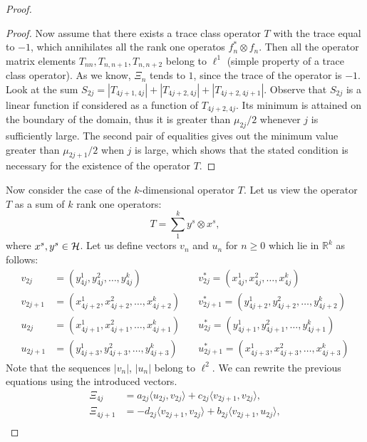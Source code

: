 \documentclass[12pt]{amsart}
\theoremstyle{case}
\begin{document}
\begin{proof}
\begin{proof}
        \medskip
        Now assume that there exists a trace class operator $T$ with the trace equal to $-1$, which annihilates all the rank one operatos $f^*_n \otimes f_n$.
        Then all the operator matrix elements $T_{nn}, T_{n, n+1}, T_{n, n+2}$ belong to $\ell^1$ (simple property of a trace class operator).
        As we know, $\Xi_n$ tends to $1$, since the trace of the operator is $-1$.
        Look at the sum $S_{2j} = |T_{4j+1, 4j}| + |T_{4j+2,4j}| + |T_{4j+2,4j+1}|$.
        Observe that $S_{2j}$ is a linear function if considered as a function of $T_{4j+2, 4j}$.
        Its minimum is attained on the boundary of the domain, thus it is greater than $\mu_{2j}/2$ whenever $j$ is sufficiently large.
        The second pair of equalities gives out the minimum value greater than $\mu_{2j+1}/2$ when $j$ is large,
          which shows that the stated condition is necessary for the existence of the operator $T$.
      \end{proof}
      Now consider the case of the $k$-dimensional operator $T$.
      Let us view the operator $T$ as a sum of $k$ rank one operators:
      \[
        T = \sum_1^k y^s \otimes x^s,
      \]
        where $x^s, y^s \in \cal{H}$.
      Let us define vectors $v_n$ and $u_n$ for $n \geq 0 $ which lie in $\mathbb{R}^k$ as follows:
      \begin{align*}
        v_{2j} &= (y^1_{4j}, y^2_{4j}, \dots ,y^k_{4j}) \quad
        &v^*_{2j} = (x^1_{4j}, x^2_{4j}, \dots ,x^k_{4j}) \\
        v_{2j+1} &= (x^1_{4j+2}, x^2_{4j+2}, \dots ,x^k_{4j+2}) \quad
        &v^*_{2j+1} = (y^1_{4j+2}, y^2_{4j+2}, \dots ,y^k_{4j+2}) \\
        u_{2j} &= (x^1_{4j+1}, x^2_{4j+1}, \dots ,x^k_{4j+1}) \quad
        &u^*_{2j} = (y^1_{4j+1}, y^2_{4j+1}, \dots ,y^k_{4j+1}) \\
        u_{2j+1} &= (y^1_{4j+3}, y^2_{4j+3}, \dots ,y^k_{4j+3}) \quad
        &u^*_{2j+1} = (x^1_{4j+3}, x^2_{4j+3}, \dots ,x^k_{4j+3}) 
      \end{align*}
      Note that the sequences $|v_n|$, $|u_n|$ belong to $\ell^2$.
      We can rewrite the previous equations using the introduced vectors.
      \begin{align*}
        \Xi_{4j} &= a_{2j} \langle u_{2j}, v_{2j}\rangle + c_{2j} \langle v_{2j+1}, v_{2j}\rangle,\\
        \Xi_{4j + 1} &= -d_{2j} \langle v_{2j+1}, v_{2j}\rangle + b_{2j} \langle v_{2j+1}, u_{2j}\rangle,\\

\end{align*}
\end{proof}
\end{document}
